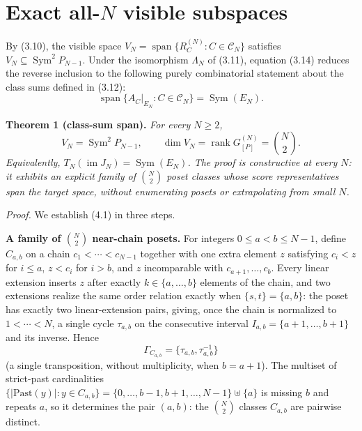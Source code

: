 \documentclass[11pt]{article}
\begin{document}
\section{Exact all-$N$ visible subspaces}

By (3.10), the visible space $V_N=\operatorname{span}\{R_C^{(N)}:C\in\mathcal C_N\}$ satisfies $V_N\subseteq\operatorname{Sym}^2P_{N-1}$. Under the isomorphism $\Lambda_N$ of (3.11), equation (3.14) reduces the reverse inclusion to the following purely combinatorial statement about the class sums defined in (3.12): \[ \operatorname{span}\{A_C|_{E_N}:C\in\mathcal C_N\}=\operatorname{Sym}(E_N). \tag{4.1} \]

\textbf{Theorem 1 (class-sum span).} \emph{For every $N\ge2$,} \[ \boxed{V_N=\operatorname{Sym}^2P_{N-1},\qquad \dim V_N=\operatorname{rank}G_{[P]}^{(N)}=\binom N2.} \] \emph{Equivalently, $T_N(\operatorname{im}J_N)=\operatorname{Sym}(E_N)$. The proof is constructive at every $N$: it exhibits an explicit family of $\binom N2$ poset classes whose score representatives span the target space, without enumerating posets or extrapolating from small $N$.}

\emph{Proof.} We establish (4.1) in three steps.

\textbf{A family of $\binom N2$ near-chain posets.} For integers $0\le a<b\le N-1$, define $C_{a,b}$ on a chain $c_1<\cdots<c_{N-1}$ together with one extra element $z$ satisfying $c_i<z$ for $i\le a$, $z<c_i$ for $i>b$, and $z$ incomparable with $c_{a+1},\ldots,c_b$. Every linear extension inserts $z$ after exactly $k\in\{a,\ldots,b\}$ elements of the chain, and two extensions realize the same order relation exactly when $\{s,t\}=\{a,b\}$: the poset has exactly two linear-extension pairs, giving, once the chain is normalized to $1<\cdots<N$, a single cycle $\tau_{a,b}$ on the consecutive interval $I_{a,b}=\{a+1,\ldots, b+1\}$ and its inverse. Hence \[ \Gamma_{C_{a,b}}=\{\tau_{a,b},\tau_{a,b}^{-1}\} \] (a single transposition, without multiplicity, when $b=a+1$). The multiset of strict-past cardinalities $\{|\mathrm{Past}(y)|:y\in C_{a,b}\}=\{0,\ldots,b-1,b+1,\ldots,N-1\}\uplus\{a\}$ is missing $b$ and repeats $a$, so it determines the pair $(a,b)$: the $\binom N2$ classes $C_{a,b}$ are pairwise distinct.
\end{document}
